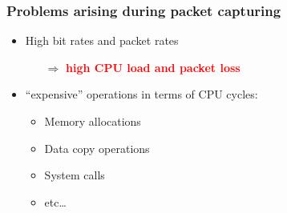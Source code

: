 \begin{frame}
\frametitle{Problems arising during packet capturing}
\begin{itemize}
	\item High bit rates and packet rates
		\begin{itemize}
			\item [$\Rightarrow$] \textbf{\textcolor{red}{high CPU load and packet loss}}
		\end{itemize}
\end{itemize}

	\begin{itemize}
	\item ``expensive'' operations in terms of CPU cycles: 
		\begin{itemize}
			\item Memory allocations
			\item Data copy operations
			\item System calls
			\item etc\ldots\newline
		\end{itemize}
	\end{itemize}

\end{frame}

 {}
